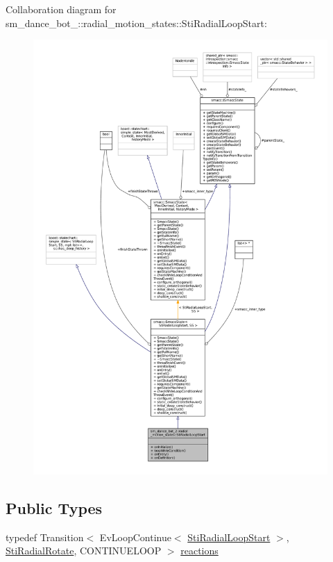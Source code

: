 Collaboration diagram for sm\+\_\+dance\+\_\+bot\+\_\+:\+:radial\+\_\+motion\+\_\+states\+:\+:Sti\+Radial\+Loop\+Start\+:
\nopagebreak
\begin{figure}[H]
\begin{center}
\leavevmode
\includegraphics[width=350pt]{structsm__dance__bot__2_1_1radial__motion__states_1_1StiRadialLoopStart__coll__graph}
\end{center}
\end{figure}
\subsection*{Public Types}
\begin{DoxyCompactItemize}
\item 
typedef Transition$<$ Ev\+Loop\+Continue$<$ \hyperlink{structsm__dance__bot__2_1_1radial__motion__states_1_1StiRadialLoopStart}{Sti\+Radial\+Loop\+Start} $>$, \hyperlink{structsm__dance__bot__2_1_1radial__motion__states_1_1StiRadialRotate}{Sti\+Radial\+Rotate}, C\+O\+N\+T\+I\+N\+U\+E\+L\+O\+OP $>$ \hyperlink{structsm__dance__bot__2_1_1radial__motion__states_1_1StiRadialLoopStart_a27957a8a39ae0f4507d93e41e6af1efc}{reactions}
\end{DoxyCompactItemize}
